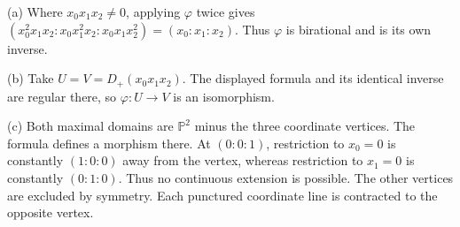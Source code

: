 (a) Where $x_0x_1x_2\ne0$, applying $\varphi$ twice gives $(x_0^2x_1x_2:x_0x_1^2x_2:x_0x_1x_2^2)=(x_0:x_1:x_2)$. Thus $\varphi$ is birational and is its own inverse.

(b) Take $U=V=D_+(x_0x_1x_2)$. The displayed formula and its identical inverse are regular there, so $\varphi:U\to V$ is an isomorphism.

(c) Both maximal domains are $\mathbb P^2$ minus the three coordinate vertices. The formula defines a morphism there. At $(0:0:1)$, restriction to $x_0=0$ is constantly $(1:0:0)$ away from the vertex, whereas restriction to $x_1=0$ is constantly $(0:1:0)$. Thus no continuous extension is possible. The other vertices are excluded by symmetry. Each punctured coordinate line is contracted to the opposite vertex.
